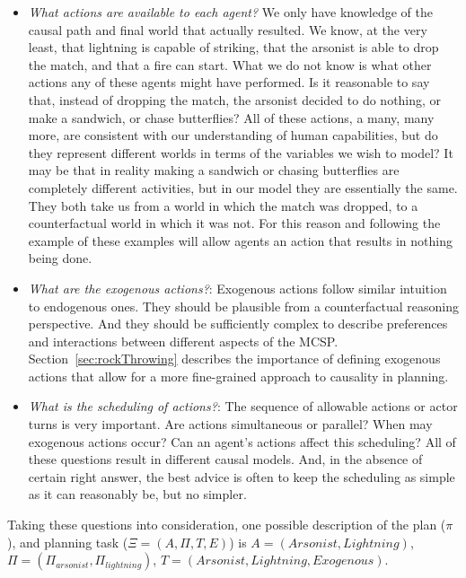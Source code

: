 \documentclass{article}
\theoremstyle{plain}
\theoremstyle{definition}
\begin{document}
\begin{itemize}
\item \textit{What actions are available to each agent?} We only have knowledge of the causal path and final world that actually resulted. We know, at the very least, that lightning is capable of striking, that the arsonist is able to drop the match, and that a fire can start. What we do not know is what other actions any of these agents might have performed. Is it reasonable to say that, instead of dropping the match, the arsonist decided to do nothing, or make a sandwich, or chase butterflies? All of these actions, a many, many more, are consistent with our understanding of human capabilities, but do they represent different worlds in terms of the variables we wish to model? It may be that in reality making a sandwich or chasing butterflies are completely different activities, but in our model they are essentially the same. They both take us from a world in which the match was dropped, to a counterfactual world in which it was not. For this reason and following the example of \cite{lind2019ethical} these examples will allow agents an action that results in nothing being done.

\item \textit{What are the exogenous actions?}: Exogenous actions follow similar intuition to endogenous ones. They should be plausible from a counterfactual reasoning perspective. And they should be sufficiently complex to describe preferences and interactions between different aspects of the MCSP. Section~\ref{sec:rockThrowing} describes the importance of defining exogenous actions that allow for a more fine-grained approach to causality in planning.

\item \textit{What is the scheduling of actions?}: The sequence of allowable actions or actor turns is very important. Are actions simultaneous or parallel? When may exogenous actions occur? Can an agent's actions affect this scheduling? All of these questions result in different causal models. And, in the absence of certain right answer, the best advice is often to keep the scheduling as simple as it can reasonably be, but no simpler.

\end{itemize}

Taking these questions into consideration, one possible description of the plan ($\pi$), and planning task ($\Xi = (A, \Pi, T, E)$) is $A=(Arsonist, Lightning)$, $\Pi=(\Pi_{arsonist}, \Pi_{lightning})$, $T=(Arsonist, Lightning, Exogenous)$.
\end{document}
